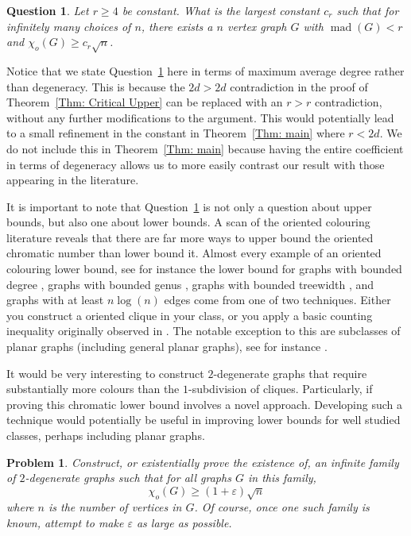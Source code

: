 \documentclass[11pt]{article}
\newtheorem{problem}[theorem]{Problem}
\newtheorem{question}[theorem]{Question}
\theoremstyle{definition}
\def\epsilon{\varepsilon}
\DeclareMathOperator{\mad}{\text{mad}}
\begin{document}
\begin{question}\label{Q: c_r}
   Let $r\geq 4$ be constant.
   What is the largest constant $c_r$ such that for infinitely many 
   choices of $n$, there exists a $n$ vertex 
   graph $G$ with $\mad(G) < r$ and $\chi_o(G)\geq c_r \sqrt{n}$.
\end{question}

Notice that we state Question~\ref{Q: c_r} here in terms of maximum average degree
rather than degeneracy.
This is because the $2d > 2d$ contradiction in the proof of Theorem~\ref{Thm: Critical Upper}
can be replaced with an $r > r$ contradiction, without any further modifications to the argument.
This would potentially lead to a small refinement in the constant 
in Theorem~\ref{Thm: main} where $r < 2d$.
We do not include this in Theorem~\ref{Thm: main}
because having the entire coefficient in terms of degeneracy
allows us to more easily contrast our result with those appearing in the literature.

It is important to note that Question~\ref{Q: c_r}
is not only a question about upper bounds, but also one about lower bounds.
A scan of the oriented colouring literature reveals that there are far more ways to 
upper bound the oriented chromatic number than lower bound it.
Almost every example of an oriented colouring lower bound, see for instance the lower bound
for graphs with bounded degree \cite{kostochka1997acyclic}, graphs with bounded genus \cite{BRADSHAW2025,clow2026oriented},
graphs with bounded treewidth \cite{sopena1997chromatic},
and graphs with at least $n\log(n)$ edges \cite{wood2007oriented}
come from one of two techniques.
Either you construct a oriented clique in your class,
or you apply a basic counting inequality originally observed in \cite{kostochka1997acyclic}.
The notable exception to this are subclasses of planar graphs (including general planar graphs),
see for instance \cite{marshall2007homomorphism, marshall2015oriented,sopena2002there}.

It would be very interesting to construct $2$-degenerate graphs that require substantially more colours
than the $1$-subdivision of cliques.
Particularly, if proving this chromatic lower bound involves 
a novel approach.
Developing such a technique would potentially
be useful in improving lower bounds for well studied classes,
perhaps including planar graphs.

\begin{problem}
    Construct, or existentially prove the existence of, an infinite family of $2$-degenerate 
    graphs such that for all graphs $G$ in this family,
    \[
    \chi_o(G) \geq (1+\epsilon)\sqrt{n}
    \]
    where $n$ is the number of vertices in $G$.
    Of course, once one such family is known, attempt to make $\epsilon$ as large
    as possible.
\end{problem}
\end{document}

